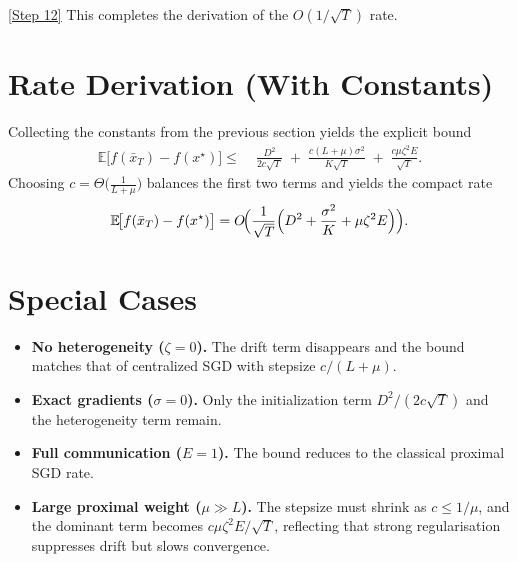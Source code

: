 \documentclass{article}
\newcommand{\E}{\mathbb{E}}
\begin{document}
\noindent\underline{[Step 12]} This completes the derivation of the $O(1/\sqrt{T})$ rate.

\section*{Rate Derivation (With Constants)}
Collecting the constants from the previous section yields the explicit bound
\[
\boxed{
\begin{aligned}
\E\!\bigl[f(\bar{x}_T)-f(x^\star)\bigr]
\le\;&\frac{D^2}{2c\sqrt{T}}
   \;+\;\frac{c(L+\mu)\sigma^2}{K\sqrt{T}}
   \;+\;\frac{c\mu\zeta^2E}{\sqrt{T}} .
\end{aligned}}
\]
Choosing $c=\Theta\!\bigl(\frac{1}{L+\mu}\bigr)$ balances the first two terms and yields the compact rate
\[
    \E\!\bigl[f(\bar{x}_T)-f(x^\star)\bigr]=O\!\Bigl(\frac{1}{\sqrt{T}}\Bigl( D^2+\frac{\sigma^2}{K}+ \mu\zeta^2E\Bigr)\Bigr).
\]

\section*{Special Cases}
\begin{itemize}
    \item \textbf{No heterogeneity ($\zeta=0$).} The drift term disappears and the bound matches that of centralized SGD with stepsize $c/(L+\mu)$.
    \item \textbf{Exact gradients ($\sigma=0$).} Only the initialization term $D^2/(2c\sqrt{T})$ and the heterogeneity term remain.
    \item \textbf{Full communication ($E=1$).} The bound reduces to the classical proximal SGD rate.
    \item \textbf{Large proximal weight ($\mu\gg L$).} The stepsize must shrink as $c\le 1/\mu$, and the dominant term becomes $c\mu\zeta^2E/\sqrt{T}$, reflecting that strong regularisation suppresses drift but slows convergence.
\end{itemize}
\end{document}
